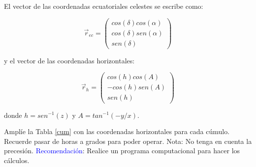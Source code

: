 \begin{answers}
\bigskip



\bigskip

El vector de las coordenadas ecuatoriales celestes se escribe como:

\bigskip

$$\vec{r}_{ec}=\left(\begin{array}{c} cos(\delta)cos(\alpha)\\cos(\delta)sen(\alpha) \\ sen(\delta)
\end{array}
 \right)$$

 
\bigskip
\noindent
y el vector de las coordenadas horizontales:

$$\vec{r}_{h}=\left(\begin{array}{c} cos(h)cos(A)\\-cos(h)sen(A) \\ sen(h)
\end{array}
 \right)$$

 \bigskip
 
\noindent
donde $h=sen^{-1}(z)$ y $A=tan^{-1}(-y/x)$.

\bigskip
 
 Amplíe la Tabla \ref{cum} con las coordenadas horizontales para cada cúmulo.  Recuerde pasar de horas a grados para poder operar. Nota: No tenga en cuenta la precesión. \textcolor{blue}{Recomendación}: Realice un programa computacional para hacer los cálculos.

 
 \bigskip

%


\end{answers}
